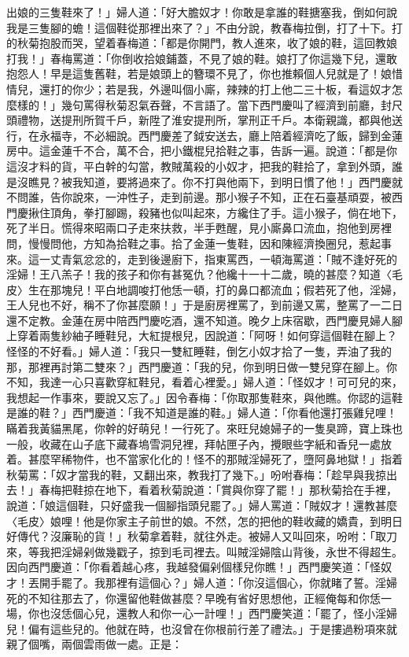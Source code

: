 \begin{showcontents}{}
出娘的三隻鞋來了！」婦人道：「好大膽奴才！你敢是拿誰的鞋搪塞我，倒如何說我是三隻腳的蟾！這個鞋從那裡出來了？」不由分說，教春梅拉倒，打了十下。打的秋菊抱股而哭，望着春梅道：「都是你開門，教人進來，收了娘的鞋，這回教娘打我！」春梅罵道：「你倒收拾娘鋪蓋，不見了娘的鞋。娘打了你這幾下兒，還敢抱怨人！早是這隻舊鞋，若是娘頭上的簪環不見了，你也推賴個人兒就是了！娘惜情兒，還打的你少；若是我，外邊叫個小廝，辣辣的打上他二三十板，看這奴才怎麼樣的！」幾句罵得秋菊忍氣吞聲，不言語了。當下西門慶叫了經濟到前廳，封尺頭禮物，送提刑所賀千戶，新陞了淮安提刑所，掌刑正千戶。本衛親識，都與他送行，在永福寺，不必細說。西門慶差了鉞安送去，廳上陪着經濟吃了飯，歸到金蓮房中。這金蓮千不合，萬不合，把小鐵棍兒拾鞋之事，告訴一遍。說道：「都是你這沒才料的貨，平白幹的勾當，教賊萬殺的小奴才，把我的鞋拾了，拿到外頭，誰是沒瞧見？被我知道，要將過來了。你不打與他兩下，到明日慣了他！」西門慶就不問誰，告你說來，一沖性子，走到前邊。那小猴子不知，正在石臺基頑耍，被西門慶揪住頂角，拳打腳踢，殺豬也似叫起來，方纔住了手。這小猴子，倘在地下，死了半日。慌得來昭兩口子走來扶救，半手甦醒，見小廝鼻口流血，抱他到房裡問，慢慢問他，方知為拾鞋之事。拾了金蓮一隻鞋，因和陳經濟換圈兒，惹起事來。這一丈青氣忿忿的，走到後邊廚下，指東罵西，一頓海罵道：「賊不逢好死的淫婦！王八羔子！我的孩子和你有甚冤仇？他纔十一十二歲，曉的甚麼？知道〈毛皮〉生在那塊兒！平白地調唆打他恁一頓，打的鼻口都流血；假若死了他，淫婦，王人兒也不好，稱不了你甚麼願！」于是廚房裡罵了，到前邊又罵，整罵了一二日還不定教。金蓮在房中陪西門慶吃酒，還不知道。晚夕上床宿歇，西門慶見婦人腳上穿着兩隻紗紬子睡鞋兒，大紅提根兒，因說道：「阿呀！如何穿這個鞋在腳上？怪怪的不好看。」婦人道：「我只一雙紅睡鞋，倒乞小奴才拾了一隻，弄油了我的那，那裡再討第二雙來？」西門慶道：「我的兒，你到明日做一雙兒穿在腳上。你不知，我達一心只喜歡穿紅鞋兒，看着心裡愛。」婦人道：「怪奴才！可可兒的來，我想起一作事來，要說又忘了。」因令春梅：「你取那隻鞋來，與他瞧。你認的這鞋是誰的鞋？」西門慶道：「我不知道是誰的鞋。」婦人道：「你看他還打張雞兒哩！瞞着我黃貓黑尾，你幹的好萌兒！一行死了。來旺兒媳婦子的一隻臭蹄，寶上珠也一般，收藏在山子底下藏春塢雪洞兒裡，拜帖匣子內，攪眼些字紙和香兒一處放着。甚麼罕稀物件，也不當家化化的！怪不的那賊淫婦死了，墮阿鼻地獄！」指着秋菊罵：「奴才當我的鞋，又翻出來，教我打了幾下。」吩咐春梅：「趁早與我掠出去！」春梅把鞋掠在地下，看着秋菊說道：「賞與你穿了罷！」那秋菊拾在手裡，說道：「娘這個鞋，只好盛我一個腳指頭兒罷了。」婦人罵道：「賊奴才！還教甚麼〈毛皮〉娘哩！他是你家主子前世的娘。不然，怎的把他的鞋收藏的嬌貴，到明日好傳代？沒廉恥的貨！」秋菊拿着鞋，就往外走。被婦人又叫回來，吩咐：「取刀來，等我把淫婦剁做幾戳子，掠到毛司裡去。叫賊淫婦陰山背後，永世不得超生。因向西門慶道：「你看着越心疼，我越發偏剁個樣兒你瞧！」西門慶笑道：「怪奴才！丟開手罷了。我那裡有這個心？」婦人道：「你沒這個心，你就睹了誓。淫婦死的不知往那去了，你還留他鞋做甚麼？早晚有省好思想他，正經俺每和你恁一場，你也沒恁個心兒，還教人和你一心一計哩！」西門慶笑道：「罷了，怪小淫婦兒！偏有這些兒的。他就在時，也沒曾在你根前行差了禮法。」于是摟過粉項來就親了個嘴，兩個雲雨做一處。正是：


\end{showcontents}
